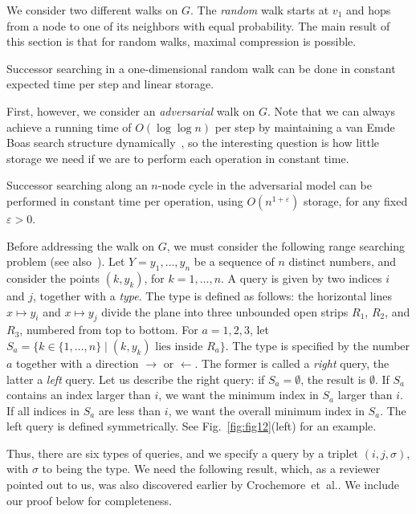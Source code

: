 \documentclass[oribibl,envcountsect,envcountsame]{llncs}
\begin{document}
We consider two different walks on $G$.
The \emph{random} walk starts at $v_1$ and hops from a node to 
one of its neighbors with equal probability.
The main result of this section is that for random walks,  maximal compression
is possible.


\begin{theorem}\label{markov-cycle}
Successor searching in a one-dimensional random
walk can be done in constant expected time per step
and linear storage.
\end{theorem}

First, however, we consider an \emph{adversarial} walk on $G$.
Note that we can always achieve a running time of $O(\log\log n)$ per step
by maintaining a van Emde Boas search structure 
dynamically~\cite{vEmdeBoasKaZi76,vEmdeBoas77}, 
so the interesting question is how little storage
we need if we are to perform each operation in constant time.


\begin{theorem}\label{adversarial-cycle}
Successor searching along an $n$-node cycle in the adversarial model
can be performed in constant time per operation, using
$O(n^{1+\varepsilon})$ storage, for any fixed $\varepsilon >0$.
\end{theorem}

Before addressing the walk on $G$, we must consider
the following range searching problem (see also~\cite{CrochemoreIlKuRaWa12}).
Let $Y= y_1,\ldots, y_n$ be a sequence of $n$ distinct numbers, and
consider the points $(k, y_k)$,  for $k = 1, \dots, n$.
A query is given by two indices $i$ and $j$, together with a \emph{type}.
The type is defined as follows:  
the horizontal lines $x \mapsto y_i$ and $x \mapsto y_j$ divide the
plane into three unbounded open strips $R_1$, $R_2$, and $R_3$, numbered from
top to bottom.  For $a = 1,2,3$, let 
$S_a = \{k \in \{1,\dots, n\} \mid (k, y_k) \text{ lies inside } R_a\}$.
The type is specified by the number $a$ together with
a direction $\rightarrow$ or $\leftarrow$. The former is called 
a \emph{right} query, the latter a \emph{left} query.
Let us describe the right query: if $S_a = \emptyset$, the 
result is $\emptyset$.  If $S_a$ contains an index larger than $i$, 
we want the minimum index in $S_a$ larger than $i$.  If all indices in $S_a$ 
are less than $i$, we want the overall minimum index in $S_a$.
The left query is defined symmetrically.
See Fig.~\ref{fig:fig12}(left) for an example.

Thus, there are six types of queries, and we specify a 
query by a triplet $(i,j,\sigma)$, with $\sigma$ to being the type. 
We need the following result, which, as a reviewer
pointed out to us, was also discovered earlier by 
Crochemore~et~al.\cite{CrochemoreIlKuRaWa12}.
We include our proof below for completeness. 
\end{document}
